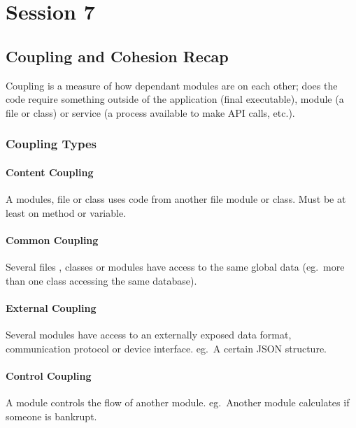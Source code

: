 \section{Session 7}\label{sec:session_7}

\subsection{Coupling and Cohesion Recap}\label{sub:coupling_and_cohesion_recap}

Coupling is a measure of how dependant modules are on each other; does the code require something outside of the application (final executable), module (a file or class) or service (a process available to make API calls, etc.).

\subsubsection{Coupling Types}\label{ssub:coupling_types}

\paragraph{Content Coupling}\label{par:content_coupling}

A modules, file or class uses code from another file module or class. Must be at least on method or variable.

\paragraph{Common Coupling}\label{par:common_coupling}

Several files , classes or modules have access to the same global data (eg.\ more than one class accessing the same database).

\paragraph{External Coupling}\label{par:external_coupling}

Several modules have access to an externally exposed data format, communication protocol or device interface. eg.\ A certain JSON structure.

\paragraph{Control Coupling}\label{par:control_coupling}

A module controls the flow of another module. eg.\ Another module calculates  if someone is bankrupt.

